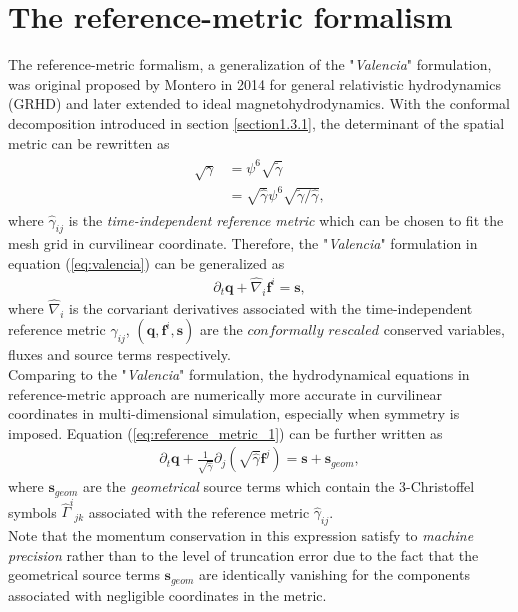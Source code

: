 \section{The reference-metric formalism} %
\label{section2.2}
The reference-metric formalism, a generalization of the "\textit{Valencia}" formulation, was original proposed by Montero \cite{montero2014general} in 2014 for general relativistic hydrodynamics (GRHD)
and later extended to ideal magnetohydrodynamics.
With the conformal decomposition introduced in section \ref{section1.3.1},
the determinant of the spatial metric can be rewritten as
\begin{align}\label{eq:reference_metric_1}
    \begin{split}
    \sqrt{\gamma} &= \psi^6 \sqrt{\tilde{\gamma}} \\
    &= \sqrt{\hat{\gamma}} \psi^6 \sqrt{\tilde{\gamma}/\hat{\gamma}},
    \end{split}
\end{align}
where $\hat{\gamma}_{ij}$ is the \textit{time-independent reference metric}
which can be chosen to fit the mesh grid in curvilinear coordinate.
Therefore, the "\textit{Valencia}" formulation in equation (\ref{eq:valencia}) can be generalized as
\begin{align}
    \partial_t \mathbf{q} + \hat{\nabla}_i \mathbf{f}^i = \mathbf{s},
\end{align}
where $\hat{\nabla}_i$ is the corvariant derivatives associated with the time-independent reference metric $\hat{\gamma}_{ij}$,
$\left(\mathbf{q},\mathbf{f}^i,\mathbf{s}\right)$ are the $\textit{conformally rescaled}$ conserved variables,
fluxes and source terms respectively.\\
Comparing to the "\textit{Valencia}" formulation,
the hydrodynamical equations in reference-metric approach are numerically more accurate in curvilinear coordinates in multi-dimensional simulation,
especially when symmetry is imposed.
Equation (\ref{eq:reference_metric_1}) can be further written as
\begin{align}
    \partial_t \mathbf{q} + \frac{1}{\sqrt{\hat{\gamma}}}\partial_j \left(\sqrt{\hat{\gamma}} \mathbf{f}^j \right) = \mathbf{s} + \mathbf{s}_{geom},
\end{align}
where $\mathbf{s}_{geom}$ are the \textit{geometrical} source terms 
which contain the 3-Christoffel symbols $\hat{\Gamma}^i{}_{jk}$ associated with the reference metric $\hat{\gamma}_{ij}$. \\
Note that the momentum conservation in this expression satisfy to \textit{machine precision} rather than to the level of truncation error 
due to the fact that the geometrical source terms $\mathbf{s}_{geom}$ are identically vanishing 
for the components associated with negligible coordinates in the metric.

